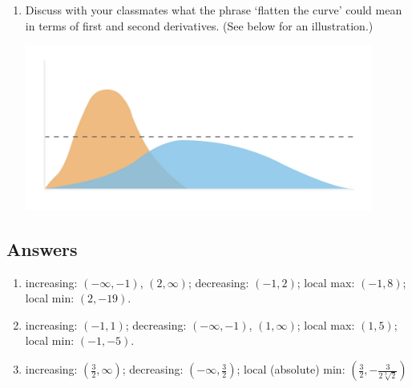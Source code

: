 \documentclass{ximera}
\begin{document}
\begin{enumerate}
\begin{enumerate}
\smallskip

\item  Discuss with your classmates what the phrase  `flatten the curve' could mean in terms of first and second derivatives.  (See below for an illustration.)


\smallskip

\centerline{\includegraphics[width = 4.5in]{./AppDerivativesGraphics/flattenthecurve.jpeg}}


\end{enumerate}




\setcounter{HW}{\value{enumi}}
\end{enumerate}

\newpage

\subsection{Answers}

\begin{enumerate}

\item increasing:  $(-\infty, -1)$, $(2, \infty)$;  decreasing:  $(-1,2)$;  local max:  $(-1,8)$;  local min:  $(2, -19)$.

\smallskip

\item increasing:  $(-1,1)$;  decreasing:  $(-\infty, -1)$, $(1, \infty)$;  local max:  $(1,5)$;  local min:  $(-1, -5)$.

\smallskip

\item increasing:  $\left( \frac{3}{2}, \infty\right)$; decreasing:  $\left( -\infty, \frac{3}{2}\right)$;  local (absolute) min:  $\left(\frac{3}{2}, -\frac{3}{2 \sqrt[3]{2}}\right)$

\smallskip

\setcounter{HW}{\value{enumi}}
\end{enumerate}
\end{document}

